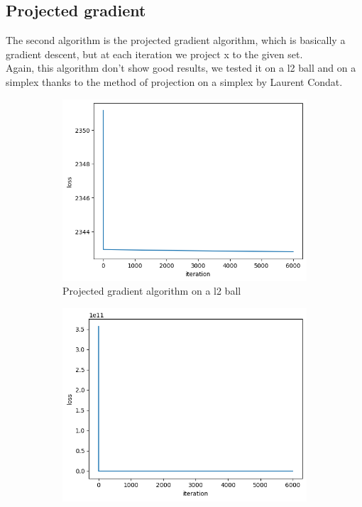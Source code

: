 \documentclass{article}
\begin{document}
        
    \subsection{Projected gradient}
        The second algorithm is the projected gradient algorithm, which is basically a gradient descent, but at each iteration we project x to the given set. \\ 
        
        Again, this algorithm don't show good results, we tested it on a l2 ball and on a simplex thanks to the method of projection on a simplex by Laurent Condat.
        
        \begin{figure}[h!]
        \begin{subfigure}{.5\textwidth}
            \centering
            \includegraphics[width=\linewidth]{images/part4_2.png}
            \caption{Projected gradient algorithm on a l2 ball}
            \label{fig:oc}
        \end{subfigure}
        \hfill
        \begin{subfigure}{.5\textwidth}
            \centering
            \includegraphics[width=\linewidth]{images/part4_4.png}

\end{subfigure}
\end{figure}
\end{document}
